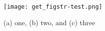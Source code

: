 \begin{figure}[scale = 1]
	\centering
	\texttt{[image: get\_figstr-test.png]}
	\label{fig:get_figstr-test}
	\caption{(a) one, (b) two,  and (c) three}
\end{figure}